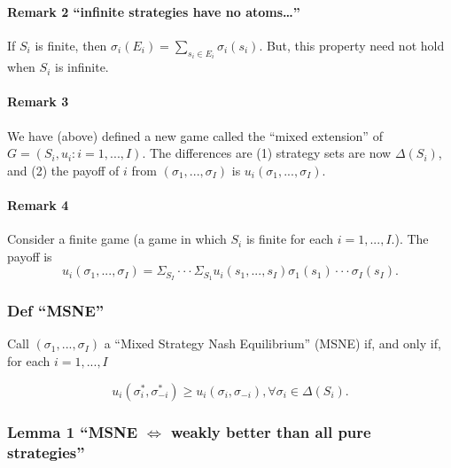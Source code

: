 \documentclass[
]{article}
\begin{document}
\hypertarget{remark-2-infinite-strategies-have-no-atoms}{%
\paragraph{\texorpdfstring{Remark 2 ``infinite strategies have no
atoms\ldots{}''}{Remark 2 ``infinite strategies have no atoms\ldots''}}\label{remark-2-infinite-strategies-have-no-atoms}}

If \(S_i\) is finite, then
\(\sigma_i(E_i) = \sum_{s_i \in E_i} \sigma_i(s_i)\). But, this property
need not hold when \(S_i\) is infinite.

\hypertarget{remark-3}{%
\paragraph{Remark 3}\label{remark-3}}

We have (above) defined a new game called the ``mixed extension'' of
\(G = (S_i, u_i: i = 1, ..., I)\). The differences are (1) strategy sets
are now \(\Delta(S_i)\), and (2) the payoff of \(i\) from
\((\sigma_1, ..., \sigma_I)\) is \(u_i(\sigma_1, ..., \sigma_I)\).

\hypertarget{remark-4}{%
\paragraph{Remark 4}\label{remark-4}}

Consider a finite game (a game in which \(S_i\) is finite for each
\(i = 1, ..., I\).). The payoff is
\[u_i(\sigma_1, ..., \sigma_I) = \Sigma_{S_I}\cdot \cdot \cdot \Sigma_{S_1}u_i(s_1, ..., s_I)\sigma_1(s_1) \cdot \cdot \cdot \sigma_I(s_I).\]

\hypertarget{def-msne}{%
\subsubsection{Def ``MSNE''}\label{def-msne}}

Call \((\sigma_1, ..., \sigma_I)\) a ``Mixed Strategy Nash Equilibrium''
(MSNE) if, and only if, for each \(i=1, ..., I\)

\[u_i(\sigma_i^*, \sigma_{-i}^*) \geq u_i(\sigma_i, \sigma_{-i}), \forall \sigma_i \in \Delta(S_i).\]

\hypertarget{lemma-1-msne-iff-weakly-better-than-all-pure-strategies}{%
\subsubsection{\texorpdfstring{Lemma 1 ``MSNE \(\iff\) weakly better
than all pure
strategies''}{Lemma 1 ``MSNE \textbackslash iff weakly better than all pure strategies''}}\label{lemma-1-msne-iff-weakly-better-than-all-pure-strategies}}
\end{document}
